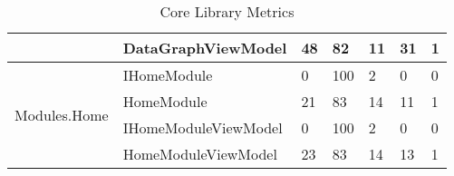 {{\begin{table}[ht]
\begin{scriptsize}
\begin{center}
\begin{tabularx}{\textwidth}{| l | X | l | l | l | l | l |}
											   & DataGraphViewModel & 48 & 82 & 11 & 31 & 1\\\cline{2-7}
				\hline
				\multirow{4}{*}{Modules.Home} & IHomeModule & 0 & 100 & 2 & 0 & 0\\\cline{2-7}
									  		  & HomeModule & 21 & 83 & 14 & 11 & 1\\\cline{2-7}
									  		  & IHomeModuleViewModel & 0 & 100 & 2 & 0 & 0\\\cline{2-7}
									  		  & HomeModuleViewModel & 23 & 83 & 14 & 13 & 1\\\cline{2-7}				
				\hline
				
				\end{tabularx}
				\caption{Core Library Metrics}
				\label{tab:CoreLib}
			\end{center}
		\end{scriptsize}
		\end{table}

	}
}

	
	
